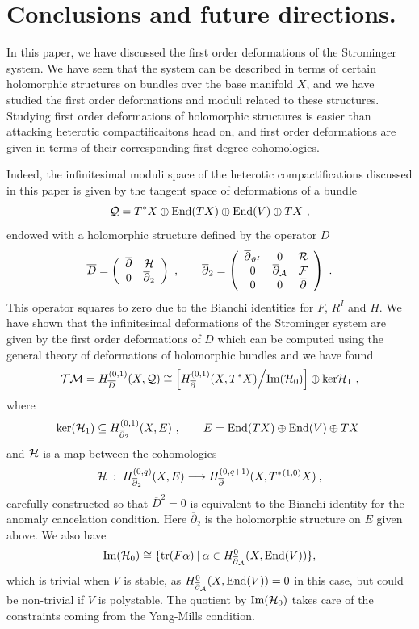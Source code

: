 \documentclass[12pt,a4paper]{article}
\def\bar#1{\overline{#1}}
\def\End{\textrm{End}}
\def\ker{\textrm{ker}}
\def\bp{\bar{\partial}}
\def\tr{\textrm{tr}}
\def\Q{\mathcal{Q}}
\theoremstyle{definition}
\begin{document}
\newpage



\section{Conclusions and future directions.}
\label{sec:conclusions}

In this paper, we have discussed the first order deformations of the Strominger system. We have seen that the system can be described in terms of certain holomorphic structures on bundles over the base manifold $X$, and we have studied the first order deformations and moduli related to these structures. Studying first order deformations of holomorphic structures is easier than attacking heterotic compactificaitons head on, and first order deformations are given in terms of their corresponding first degree cohomologies. 

Indeed, the infinitesimal moduli space of the heterotic compactifications discussed in this paper is given by the tangent space of deformations of a bundle
\[{\cal Q} = T^*X\oplus \End(TX) \oplus \End(V) \oplus TX~,\]
endowed with a holomorphic structure defined by the operator $\bar D$ 
\begin{equation*}
\overline D =
\left(
\begin{array}{cc}
\bp & {\cal H}\\
0 & \bp_2\\
\end{array}
\right)~,\qquad
\bp_2 =
\left(
\begin{array}{ccc}
\bp_{\vartheta^I} & 0 & {\cal R}\\
0 & \bp_{\cal A} & {\cal F}\\
0 & 0 & \bp
\end{array}
\right)~.
\end{equation*}
This operator squares to zero due to the Bianchi identities for $F$, $R^I$ and $H$. We have shown that the  infinitesimal deformations of the Strominger system are given by the first order deformations of $\bar D$ which can be computed using the general theory of deformations of holomorphic bundles and we have found
\[ {\cal TM} = H_{\bar D}^{(0,1)}(X, \Q) \cong \Big[H_{\bp}^{(0,1)}(X, T^*X)\Big/\textrm{Im}({\cal H}_0)\Big] \oplus \ker{\cal H}_1~,\]
where 
\[\ker({\cal H}_1)\subseteq  H_{\bp_2}^{(0,1)}(X, E) ~,
\qquad E  = \End(TX) \oplus \End(V) \oplus TX~\]
and $\cal H$ is a map between the cohomologies
\begin{equation*}
{\cal H}\;:\;H_{\bp_2}^{(0,q)}(X, E)\longrightarrow H_{\bp}^{(0,q+1)}(X, T^*{}^{(1,0)}X)\:,
\end{equation*}
carefully constructed so that $\overline D^2=0$ is equivalent to the Bianchi identity for the anomaly cancelation condition.
Here $\bp_2$ is the holomorphic structure on $E$ given above. We also have
\begin{equation*}
\textrm{Im}({\cal H}_0)\cong\{\tr(F\alpha)\:\vert\:\alpha\in H^0_{\bp_{\cal A}}(X,\End(V))\},
\end{equation*}
which is trivial when $V$ is stable, as $H^0_{\bp_{\cal A}}(X,\End(V))=0$ in this case, but could be non-trivial if $V$ is polystable. The quotient by $\textrm{Im}({\cal H}_0)$ takes care of the constraints coming from the Yang-Mills condition.
\end{document}
